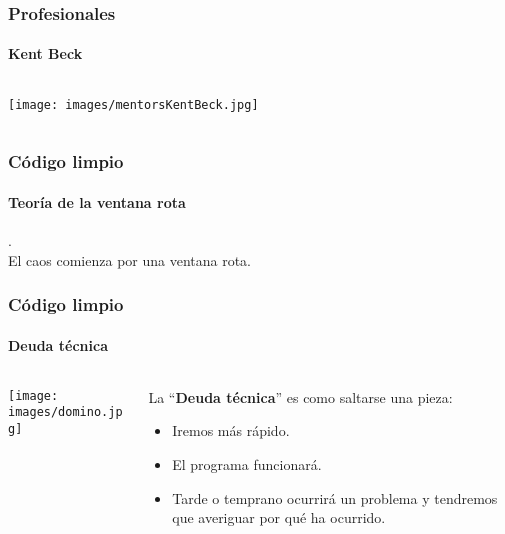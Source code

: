  \begin{frame}
  \frametitle{Profesionales}
  \framesubtitle{Kent Beck}
  \begin{columns}
   \begin{column}{4cm}
    \texttt{[image: images/mentorsKentBeck.jpg]}
   \end{column}
   \begin{column}{6cm}
   \end{column}
  \end{columns}
 \end{frame}

  {

  \begin{frame}
   \frametitle{Código limpio}
   \framesubtitle{Teoría de la ventana rota}
   .%
   \\[6pc]
   El caos comienza por una ventana rota.

  \end{frame}
  }

  {
   \usebackgroundtemplate{}

  \begin{frame}
   \frametitle{Código limpio}
   \framesubtitle{Deuda técnica}

   \begin{columns}
    \begin{column}{4cm}
     \texttt{[image: images/domino.jpg]}
     \end{column}
    \begin{column}{7cm}
     La ``\textbf{Deuda técnica}'' es como saltarse una pieza:
     \begin{itemize}
      \item<+-> Iremos más rápido.
      \item<+-> El programa funcionará.
      \item<+-> Tarde o temprano ocurrirá un problema y tendremos que
	    averiguar por qué ha ocurrido.
     \end{itemize}
    \end{column}
   \end{columns}
  \end{frame}
  }
